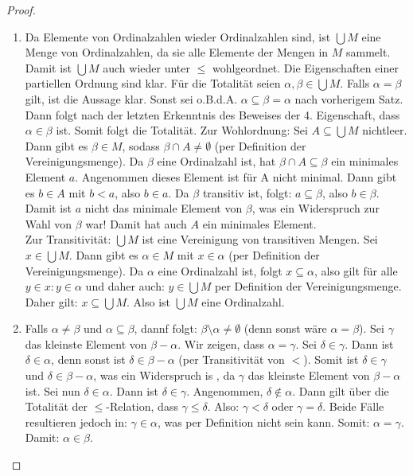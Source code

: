 \documentclass[11pt]{scrartcl}
\begin{document}
\begin{proof}
\begin{enumerate}
		\item Da Elemente von Ordinalzahlen wieder Ordinalzahlen sind, ist $\bigcup M$ eine Menge von Ordinalzahlen, da sie alle Elemente der Mengen in $M$ sammelt. Damit ist $\bigcup M$ auch wieder unter $\leq$ wohlgeordnet. Die Eigenschaften einer partiellen Ordnung sind klar. Für die Totalität seien $\alpha, \beta \in \bigcup M$. Falls $\alpha = \beta$ gilt, ist die Aussage klar. Sonst sei o.B.d.A. $ \alpha \subseteq \beta = \alpha$ nach vorherigem Satz. Dann folgt nach der letzten Erkenntnis des Beweises der 4. Eigenschaft, dass $\alpha \in \beta$ ist. Somit folgt die Totalität. Zur Wohlordnung: Sei $ A \subseteq \bigcup M$ nichtleer. Dann gibt es $\beta\in M$, sodass $\beta \cap A \neq \emptyset$ (per Definition der Vereinigungsmenge). Da $\beta$ eine Ordinalzahl ist, hat $\beta \cap A \subseteq \beta$ ein minimales Element $a$. Angenommen dieses Element ist für A nicht minimal. Dann gibt es $b \in A$ mit $b < a$, also $b \in a$. Da $\beta$ transitiv ist, folgt: $ a \subseteq \beta$, also $b \in \beta$. Damit ist $a$ nicht das minimale Element von $\beta$, was ein Widerspruch zur Wahl von $\beta$ war! Damit hat auch $A$ ein minimales Element.\\
			Zur Transitivität: $\bigcup M$ ist eine Vereinigung von transitiven Mengen. Sei $x \in \bigcup M$. Dann gibt es $\alpha \in M$ mit $x\in \alpha$ (per Definition der Vereinigungsmenge). Da $\alpha$ eine Ordinalzahl ist, folgt $ x \subseteq \alpha$, also gilt für alle $y\in x: y\in \alpha$ und daher auch: $y\in \bigcup M$ per Definition der Vereinigungsmenge. Daher gilt: $ x \subseteq \bigcup M$. Also ist $\bigcup M$ eine Ordinalzahl.
		\item Falls $\alpha\neq \beta$ und $\alpha\subseteq \beta$, dannf folgt: $\beta\setminus \alpha\neq \emptyset$ (denn sonst wäre $\alpha=\beta$). Sei $\gamma$ das kleinste Element von $\beta-\alpha$.
			Wir zeigen, dass $\alpha=\gamma$. Sei $\delta\in \gamma$. Dann ist $\delta\in 
			\alpha$, denn sonst ist $\delta \in \beta-\alpha$ (per Transitivität von $<$). 
			Somit ist $\delta\in\gamma$ und $\delta\in \beta-\alpha$, was ein Widerspruch is
			, da $\gamma$ das kleinste Element von $\beta-\alpha$ ist. Sei nun $\delta\in \alpha$.
			Dann ist $\delta\in \gamma$. Angenommen, $\delta\notin\alpha$. Dann gilt über die
			Totalität der $\leq$-Relation, dass $\gamma \leq \delta$. Also: $\gamma < \delta$
			oder $\gamma = \delta$. Beide Fälle resultieren jedoch in: $\gamma\in\alpha$, was
			per Definition nicht sein kann. Somit: $\alpha=\gamma$. Damit: $\alpha\in\beta$.
	\end{enumerate}
\end{proof}
\end{document}
